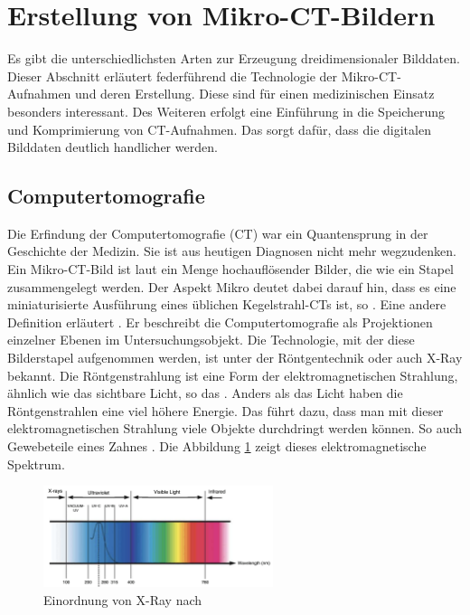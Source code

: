 \section{Erstellung von Mikro-CT-Bildern}
\label{sec:technologisch} Es gibt die unterschiedlichsten Arten zur Erzeugung
dreidimensionaler Bilddaten. Dieser Abschnitt erläutert federführend die Technologie
der Mikro-\ac{CT}-Aufnahmen und deren Erstellung. Diese sind für einen medizinischen
Einsatz besonders interessant. Des Weiteren erfolgt eine Einführung in die
Speicherung und Komprimierung von \ac{CT}-Aufnahmen. Das sorgt dafür, dass die digitalen
Bilddaten deutlich handlicher werden.

\subsection{Computertomografie}
\label{subsec:computertomografie} Die Erfindung der Computertomografie (\ac{CT})
war ein Quantensprung in der Geschichte der Medizin. Sie ist aus heutigen Diagnosen
nicht mehr wegzudenken. Ein Mikro-\ac{CT}-Bild ist laut \citet[S.~1]{baird2017}
ein Menge hochauflösender Bilder, die wie ein Stapel zusammengelegt werden. Der
Aspekt Mikro deutet dabei darauf hin, dass es eine miniaturisierte Ausführung eines
üblichen Kegelstrahl-\ac{CT}s ist, so \citet[S.~340]{buzug2011}. Eine andere
Definition erläutert \citet[S.~49]{lehmann2013bildverarbeitung}. Er beschreibt
die Computertomografie als Projektionen einzelner Ebenen im Untersuchungsobjekt.
Die Technologie, mit der diese Bilderstapel aufgenommen werden, ist unter der Röntgentechnik
oder auch \ac{X-Ray} bekannt. Die Röntgenstrahlung ist eine Form der elektromagnetischen
Strahlung, ähnlich wie das sichtbare Licht, so das \citet[K.~1]{nib2024}. Anders
als das Licht haben die Röntgenstrahlen eine viel höhere Energie. Das führt dazu,
dass man mit dieser elektromagnetischen Strahlung viele Objekte durchdringt werden
können. So auch Gewebeteile eines Zahnes \citep[vgl.][K.~1]{nib2024}. Die
Abbildung \ref{fig:spectrum} zeigt dieses elektromagnetische Spektrum.

\begin{figure}[h]
	\centering
	\includegraphics[width=0.6\textwidth]{img/x_ray.jpg}
	\caption{Einordnung von X-Ray nach \citet[S.~5]{zwinkels2015}}
	\label{fig:spectrum}
\end{figure}

